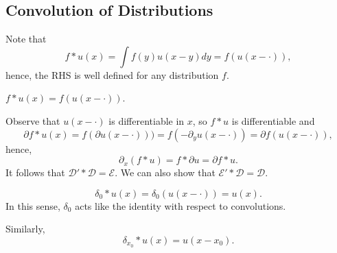 \documentclass[11pt]{scrartcl}
\begin{document}
\subsection{Convolution of Distributions}
Note that 
$$f*u(x) = \int f(y)u(x-y) dy = f(u(x- \cdot)),$$
hence, the RHS is well defined for any distribution $f$. 
\begin{definition} $f * u(x) = f(u(x - \cdot)).$
\end{definition}
Observe that $u(x-\cdot )$ is differentiable in $x$, so $f*u$ is differentiable and $$\partial f*u(x) = f(\partial u(x-\cdot))) = f(-\partial_y u(x-\cdot)) = \partial f(u(x- \cdot)),$$
hence,
  $$\partial_x(f * u) = f * \partial u = \partial f * u.$$
It follows that $\mathcal D' * \mathcal D = \mathcal E$.  We can also show that $\mathcal E' * \mathcal D = \mathcal D$.
\begin{example} $$\delta_0 * u(x) = \delta_0(u(x- \cdot)) = u(x).$$  In this sense, $\delta_0$ acts like the identity with respect to convolutions.

Similarly,
$$\delta_{x_0}*u(x) = u(x-x_0).$$
\end{example}
\end{document}
